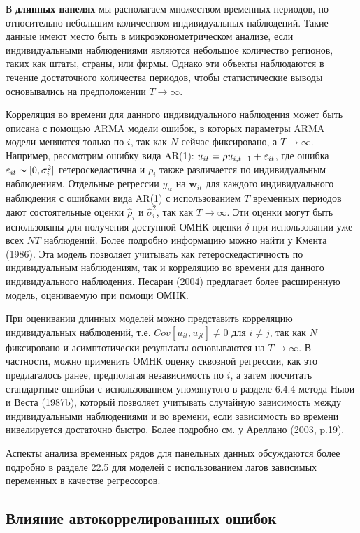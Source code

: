 В {\bf длинных панелях} мы располагаем множеством временных периодов, но относительно небольшим количеством индивидуальных наблюдений. Такие данные имеют место быть в микроэконометрическом анализе, если индивидуальными наблюдениями являются небольшое количество регионов, таких как штаты, страны, или фирмы. Однако эти объекты наблюдаются в течение достаточного количества периодов, чтобы статистические выводы основывались на предположении $T \rightarrow \infty$. 

Корреляция во времени для данного индивидуального наблюдения может быть описана с помощью ARMA  модели ошибок, в которых параметры ARMA модели меняются только по $i$, так как $N$ сейчас фиксировано, а  $T \rightarrow \infty$. Например, рассмотрим ошибку вида AR(1): $u_{it}=\rho u_{i,t-1}+\varepsilon_{it}$, где ошибка $\varepsilon_{it} \thicksim [0,\sigma^2_i]$ гетероскедастична и $\rho_i$ также различается по индивидуальным наблюдениям. Отдельные регрессии $y_{it}$ на $\mathbf w_{it}$
для каждого индивидуального наблюдения с ошибками вида AR(1) с использованием $T$ временных периодов дают состоятельные оценки $\hat \rho_i$ и $\hat \sigma^2_i$, так как  $T \rightarrow \infty$. Эти оценки могут быть использованы для получения доступной ОМНК оценки $\delta$ при использовании уже всех $NT$ наблюдений. Более подробно информацию можно найти у Кмента (1986). Эта модель позволяет учитывать как гетероскедастичность по индивидуальным наблюдениям, так и корреляцию во времени для данного индивидуального наблюдения. Песаран (2004) предлагает более расширенную модель, оцениваемую при помощи ОМНК.

При оценивании длинных моделей можно представить корреляцию индивидуальных наблюдений, т.е. $Cov[u_{it}, u_{jt}] \neq 0$ для $i \neq j$, так как $N$ фиксировано и асимптотически результаты основываются на $T \rightarrow \infty$. В частности, можно применить ОМНК оценку сквозной регрессии, как это предлагалось ранее, предполагая независимость по $i$, а затем посчитать стандартные ошибки с использованием упомянутого в разделе 6.4.4 метода Ньюи и Веста (1987b), который позволяет учитывать случайную зависимость между индивидуальными наблюдениями  и во времени, если зависимость во времени нивелируется достаточно быстро. Более подробно см. у Ареллано (2003, p.19). 

Аспекты анализа временных рядов для панельных данных обсуждаются более подробно в разделе 22.5 для моделей с использованием лагов зависимых переменных в качестве регрессоров.

\subsection{Влияние автокоррелированных ошибок}

